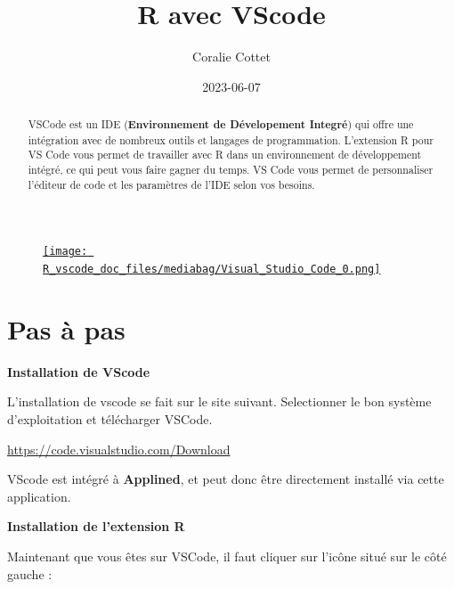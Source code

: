 \documentclass[
  letterpaper,
  DIV=11,
  numbers=noendperiod]{scrartcl}
\title{R avec VScode}
\author{Coralie Cottet}
\date{2023-06-07}
\begin{document}
\maketitle
\begin{abstract}
VSCode est un IDE (\textbf{Environnement de Dévelopement Integré}) qui
offre une intégration avec de nombreux outils et langages de
programmation. L'extension R pour VS Code vous permet de travailler avec
R dans un environnement de développement intégré, ce qui peut vous faire
gagner du temps. VS Code vous permet de personnaliser l'éditeur de code
et les paramètres de l'IDE selon vos besoins.
\end{abstract}
\begin{figure}

{\centering 

\href{https://code.visualstudio.com/}{\texttt{[image: R\_vscode\_doc\_files/mediabag/Visual\_Studio\_Code\_0.png]}}

}

\end{figure}

\hypertarget{pas-uxe0-pas}{%
\section{Pas à pas}\label{pas-uxe0-pas}}

\textbf{Installation de VScode}

L'installation de vscode se fait sur le site suivant. Selectionner le
bon système d'exploitation et télécharger VSCode.

\url{https://code.visualstudio.com/Download}

\begin{tcolorbox}[enhanced jigsaw, colframe=quarto-callout-tip-color-frame, toprule=.15mm, titlerule=0mm, opacityback=0, bottomtitle=1mm, bottomrule=.15mm, rightrule=.15mm, title=\textcolor{quarto-callout-tip-color}{\faLightbulb}\hspace{0.5em}{A l'Ined}, leftrule=.75mm, colbacktitle=quarto-callout-tip-color!10!white, toptitle=1mm, arc=.35mm, colback=white, opacitybacktitle=0.6, breakable, left=2mm, coltitle=black]

VScode est intégré à \textbf{Applined}, et peut donc être directement
installé via cette application.

\end{tcolorbox}

\textbf{Installation de l'extension R}

Maintenant que vous êtes sur VSCode, il faut cliquer sur l'icône situé
sur le côté gauche :
\end{document}

